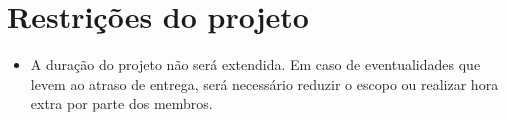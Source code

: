\section{Restrições do projeto}

  \begin{itemize}
    \item A duração do projeto não será extendida. Em caso de eventualidades que
    levem ao atraso de entrega, será necessário reduzir o escopo ou realizar
    hora extra por parte dos membros.
  \end{itemize}
